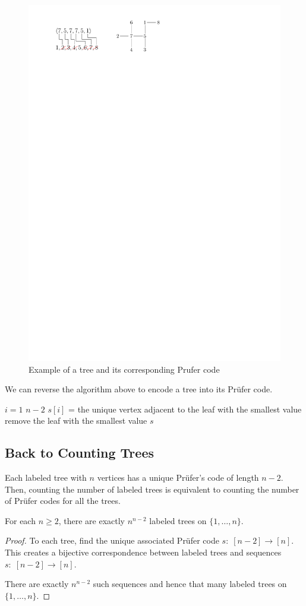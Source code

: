\begin{figure}[htbp]
    \centering
    \includegraphics[width=0.5\linewidth]{figures/prufer-code-example.pdf}
    \caption{Example of a tree and its corresponding Prufer code}
    \label{fig:prufer-code-example}
\end{figure}

We can reverse the algorithm above to encode a tree into its Pr\"ufer code.

\begin{codebox}
    \li \For $i = 1$ \To $n-2$ \Do
        \li $s[i]$ = the unique vertex adjacent to the leaf with the smallest value
        \li remove the leaf with the smallest value
    \End
    \li \Return $s$
\end{codebox}

\subsection{Back to Counting Trees}

Each labeled tree with $n$ vertices has a unique Pr\"ufer's code of length $n-2$. Then, counting the number of labeled trees is equivalent to counting the number of Pr\"ufer codes for all the trees.

\begin{theorem}
    For each $n \geq 2$, there are exactly $n^{n-2}$ labeled trees on $\{1,\ldots,n\}$.
\end{theorem}

\begin{proof}
    To each tree, find the unique associated Pr\"ufer code $s:\; [n-2] \to [n]$. This creates a bijective correspondence between labeled trees and sequences $s:\; [n-2] \to [n]$.

    There are exactly $n^{n-2}$ such sequences and hence that many labeled trees on $\{1,\ldots,n\}$.
\end{proof}

